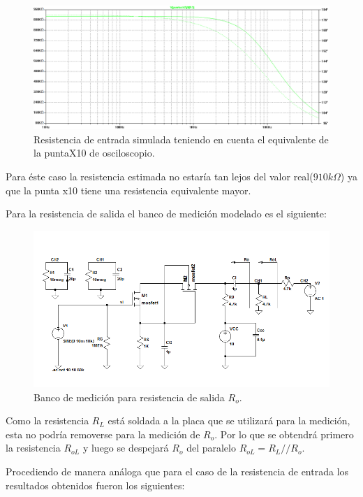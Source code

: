 \documentclass[10pt,spanish,a4paper,notitlepage]{article}
\begin{document}
\begin{figure}[H]
\centering
\includegraphics[scale=0.45]{senales/simulacion-Ri-con-puntax10.png}
\caption{Resistencia de entrada simulada teniendo en cuenta el equivalente de la puntaX10 de osciloscopio.}
\label{fig:SIMURi_con_puntax10}
\end{figure}

Para éste caso la resistencia estimada no estaría tan lejos del valor real($910k\Omega$) ya que la punta x10 tiene una resistencia equivalente mayor.

Para la resistencia de salida el banco de medición modelado es el siguiente:


\begin{figure}[H]
\centering
\includegraphics[scale=0.75]{circuitos/Esquematico-simulacion-Ro.png}
\caption{Banco de medición para resistencia de salida $R_{o}$.}
\label{fig:Rototal}
\end{figure}

Como la resistencia $R_L$ está soldada a la placa que se utilizará
para la medición, esta no podría removerse para la medición de $R_o$.
Por lo que se obtendrá primero la resistencia $R_{oL}$ y luego
se despejará $R_o$ del paralelo $R_{oL} = R_L // R_o$.

Procediendo de manera análoga que para el caso de la resistencia de entrada los resultados obtenidos fueron los siguientes:
\end{document}
